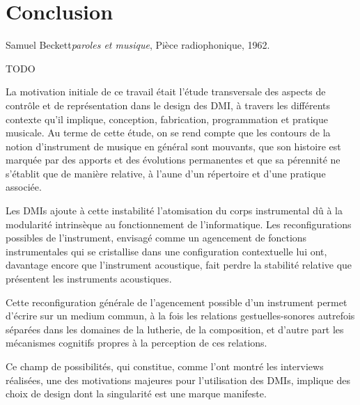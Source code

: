 %
\chapter{Conclusion}
\label{ch:conclusion}

{Samuel Beckett}{\textit{paroles et musique}, Pièce radiophonique, 1962. \cite{beckett_comeet_2014}}

TODO

\noindent La motivation initiale de ce travail était l'étude transversale des aspects de contrôle et de représentation dans le design des \gls{DMI}, à travers les différents contexte qu'il implique, conception, fabrication, programmation et pratique musicale. Au terme de cette étude, on se rend compte que les contours de la notion d'instrument de musique en général sont mouvants, que son histoire est marquée par des apports et des évolutions permanentes et que sa pérennité ne s'établit que de manière relative, à l'aune d'un répertoire et d'une pratique associée.

Les \glspl{DMI} ajoute à cette instabilité l'atomisation du corps instrumental dû à la modularité intrinsèque au fonctionnement de l'informatique. Les reconfigurations possibles de l'instrument, envisagé comme un agencement de fonctions instrumentales qui se cristallise dans une configuration contextuelle lui ont, davantage encore que l'instrument acoustique, fait perdre la stabilité relative que présentent les instruments acoustiques.

Cette reconfiguration générale de l'agencement possible d'un instrument permet d'écrire sur un medium commun, à la fois les relations gestuelles-sonores autrefois séparées dans les domaines de la lutherie, de la composition, et d'autre part les mécanismes cognitifs propres à la perception de ces relations.


Ce champ de possibilités, qui constitue, comme l'ont montré les interviews réalisées, une des motivations majeures pour l'utilisation des \glspl{DMI}, implique des choix de design dont la singularité est une marque manifeste. 

